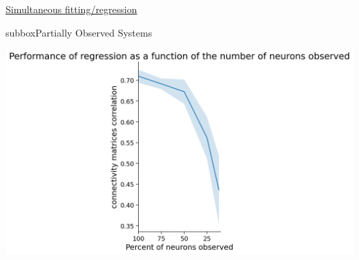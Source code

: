 \begin{textbox}{\href{https://compneuro.neuromatch.io/tutorials/W3D5_NetworkCausality/student/W3D5_Tutorial3.html}{Simultaneous fitting/regression }   }
\begin{subbox}{subbox}{Partially Observed Systems}
\begin{center}
    
\includegraphics[scale=0.25]{Figures/NC/NC_Figure17.png}

\end{center}
\end{subbox}

\end{textbox}
\newpage

